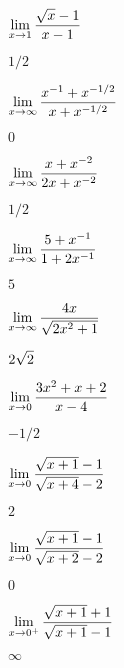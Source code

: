 \begin{exercises}
\begin{exercise} $\displaystyle\lim_{x\to1}{\sqrt{x}-1\over x-1}$
\begin{answer} $1/2$
\end{answer}\end{exercise}

\begin{exercise} $\displaystyle\lim_{x\to\infty}{x^{-1}+x^{-1/2}\over x+x^{-1/2}}$
\begin{answer} $0$
\end{answer}\end{exercise}

\begin{exercise} $\displaystyle\lim_{x\to\infty}{x+x^{-2}\over 2x+x^{-2}}$
\begin{answer} $1/2$
\end{answer}\end{exercise}

\begin{exercise} $\displaystyle\lim_{x\to\infty}{5+x^{-1}\over 1+2x^{-1}}$
\begin{answer} $5$
\end{answer}\end{exercise}

\begin{exercise} $\displaystyle\lim_{x\to\infty}{4x\over\sqrt{2x^2+1}}$
\begin{answer} $\displaystyle 2\sqrt2$
\end{answer}\end{exercise}

\begin{exercise} $\displaystyle\lim_{x\to0}{3x^2+x+2\over x-4}$
\begin{answer} $-1/2$
\end{answer}\end{exercise}

\begin{exercise} $\displaystyle\lim_{x\to0}{\sqrt{x+1}-1\over \sqrt{x+4}-2}$
\begin{answer} $2$
\end{answer}\end{exercise}

\begin{exercise} $\displaystyle\lim_{x\to0}{\sqrt{x+1}-1\over \sqrt{x+2}-2}$
\begin{answer} $0$
\end{answer}\end{exercise}

\begin{exercise} $\displaystyle\lim_{x\to0^+}{\sqrt{x+1}+1\over\sqrt{x+1}-1}$
\begin{answer} $\infty$
\end{answer}\end{exercise}


\end{exercises}
